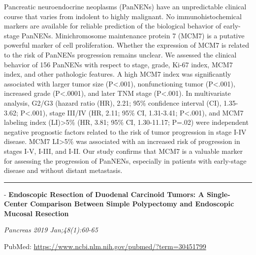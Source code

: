 \documentclass[]{article}
\begin{document}
Pancreatic neuroendocrine neoplasms (PanNENs) have an unpredictable
clinical course that varies from indolent to highly malignant. No
immunohistochemical markers are available for reliable prediction of the
biological behavior of early-stage PanNENs. Minichromosome maintenance
protein 7 (MCM7) is a putative powerful marker of cell proliferation.
Whether the expression of MCM7 is related to the risk of PanNENs
progression remains unclear. We assessed the clinical behavior of 156
PanNENs with respect to stage, grade, Ki-67 index, MCM7 index, and other
pathologic features. A high MCM7 index was significantly associated with
larger tumor size (P\textless{}.001), nonfunctioning tumor
(P\textless{}.001), increased grade (P\textless{}.0001), and later TNM
stage (P\textless{}.001). In multivariate analysis, G2/G3 (hazard ratio
(HR), 2.21; 95\% confidence interval (CI), 1.35-3.62; P\textless{}.001),
stage III/IV (HR, 2.11; 95\% CI, 1.31-3.41; P\textless{}.001), and MCM7
labeling index (LI)\textgreater{}5\% (HR, 3.81; 95\% CI, 1.30-11.17;
P=.02) were independent negative prognostic factors related to the risk
of tumor progression in stage I-IV disease. MCM7 LI\textgreater{}5\% was
associated with an increased risk of progression in stages I-V, I-III,
and I-II. Our study confirms that MCM7 is a valuable marker for
assessing the progression of PanNENs, especially in patients with
early-stage disease and without distant metastasis.

{}

{}

\begin{center}\rule{0.5\linewidth}{\linethickness}\end{center}

 - \textbf{Endoscopic Resection of Duodenal Carcinoid Tumors: A
Single-Center Comparison Between Simple Polypectomy and Endoscopic
Mucosal Resection}

\emph{Pancreas 2019 Jan;48(1):60-65}

PubMed: \url{https://www.ncbi.nlm.nih.gov/pubmed/?term=30451799}
\end{document}
